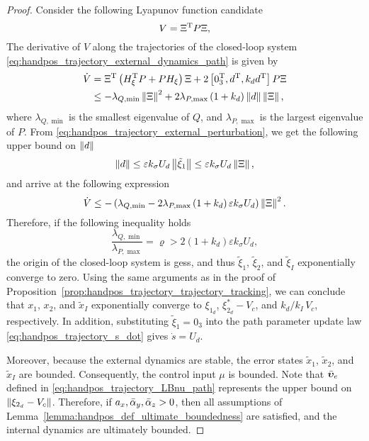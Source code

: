 \begin{proof}
    Consider the following Lyapunov function candidate
    \begin{equation}
        V = \Xi^{\mathrm{T}} P \Xi,
    \end{equation}
    The derivative of $V$ along the trajectories of the closed-loop system \eqref{eq:handpos_trajectory_external_dynamics_path} is given by
    \begin{equation}
    \begin{split}
        \dot{V} &= \Xi^{\mathrm{T}}\left(H_{\xi}^{\mathrm{T}} P + PH_{\xi}\right)\Xi + 2 \left[0_3^{\mathrm{T}}, d^{\mathrm{T}}, k_d d^{\mathrm{T}}\right] P \Xi \\
            &\leq -\lambda_{Q,\min}\left\|\Xi\right\|^2 + 2 \lambda_{P,\max}\left(1 + k_d\right)\left\|d\right\|\left\|\Xi\right\|,
    \end{split}
    \end{equation}
    where $\lambda_{Q,\min}$ is the smallest eigenvalue of $Q$, and $\lambda_{P,\max}$ is the largest eigenvalue of $P$.
    From \eqref{eq:handpos_trajectory_external_perturbation}, we get the following upper bound on $\left\|d\right\|$
    \begin{equation}
        \left\|d\right\| \leq \varepsilon k_{\sigma} U_d \left\|\tilde{\xi}_1\right\| \leq \varepsilon k_{\sigma} U_d \left\|\Xi\right\|,
    \end{equation}
    and arrive at the following expression
    \begin{equation}
        \dot{V} \leq - \left(\lambda_{Q,\min} - 2 \lambda_{P,\max}\left(1 + k_d\right)\varepsilon k_{\sigma} U_d\right) \left\|\Xi\right\|^2.
    \end{equation}
    Therefore, if the following inequality holds
    \begin{equation}
        \frac{\lambda_{Q,\min}}{\lambda_{P,\max}} = \varrho > 2\left(1 + k_d\right)\varepsilon k_{\sigma} U_d,
    \end{equation}
    the origin of the closed-loop system is \glspl{ges}, and thus $\tilde{\xi}_1$, $\tilde{\xi}_2$, and $\tilde{\xi}_I$ exponentially converge to zero.
    Using the same arguments as in the proof of Proposition~\ref{prop:handpos_trajectory_trajectory_tracking}, we can conclude that $x_1$, $x_2$, and $\tilde{x}_I$ exponentially converge to $\xi_{1_d}$, $\xi_{2_d}^{*} - V_c$, and $k_d/k_I\,V_c$, respectively.
    In addition, substituting $\tilde{\xi}_1 = 0_3$ into the path parameter update law \eqref{eq:handpos_trajectory_s_dot} gives $\dot{s} = U_d$.

    Moreover, because the external dynamics are stable, the error states $\tilde{x}_1$, $\tilde{x}_2$, and $\tilde{x}_I$ are bounded.
    Consequently, the control input $\mu$ is bounded.
    Note that $\Bar{\bm{\upsilon}}_e$ defined in \eqref{eq:handpos_trajectory_LBnu_path} represents the upper bound on $\left\|\xi_{2_d} - V_c\right\|$.
    Therefore, if $a_x, \Bar{\alpha}_y, \Bar{\alpha}_z > 0$, then all assumptions of Lemma~\ref{lemma:handpos_def_ultimate_boundedness} are satisfied, and the internal dynamics are ultimately bounded.
\end{proof}

